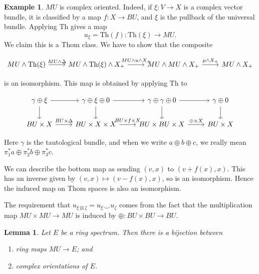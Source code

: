 \documentclass{shortart}
\newtheorem{lemma}[thm]{Lemma}
\theoremstyle{definition}
\newtheorem{eg}[thm]{Example}
\newcommand\Th{\mathrm{Th}}
\begin{document}
\begin{eg}
  $MU$ is complex oriented. Indeed, if $\xi: V \to X$ is a complex vector bundle, it is classified by a map $f: X \to BU$, and $\xi$ is the pullback of the universal bundle. Applying $\Th$ gives a map
  \[
    u_\xi = \Th(f): \Th(\xi) \to MU.
  \]
  We claim this is a Thom class. We have to show that the composite
  \begin{useimager}
    \[
      \begin{tikzcd}
        MU \wedge \Th(\xi) \ar[r, "MU \wedge \Delta"] & MU \wedge \Th(\xi) \wedge X_+ \ar[r, "MU \wedge u \wedge X_+"] & MU \wedge MU \wedge X_+ \ar[r, "\mu \wedge X_+"] & MU \wedge X_+
      \end{tikzcd}
    \]
  \end{useimager}
  is an isomorphism. This map is obtained by applying $\Th$ to
  \begin{useimager}
    \[
      \begin{tikzcd}
        \gamma \oplus \xi \ar[d] \ar[r] & \gamma \oplus \xi \oplus 0 \ar[d] \ar[r] & \gamma \oplus \gamma \oplus 0 \ar[d] \ar[r] & \gamma \oplus 0 \ar[d]\\
        BU \times X \ar[r, "BU \times \Delta"] & BU \times X \times X \ar[r, "BU \times f \times X"] & BU \times BU \times X \ar[r, "\oplus \times X"] & BU \times X
      \end{tikzcd}
    \]
  \end{useimager}
  Here $\gamma$ is the tautological bundle, and when we write $a \oplus b \oplus c$, we really mean $\pi_1^* a \oplus \pi_2^* b \oplus \pi_3^* c$.

  We can describe the bottom map as sending $(v, x)$ to $(v + f(x), x)$. This has an inverse given by $(v, x) \mapsto (v - f(x), x)$, so is an isomorphism. Hence the induced map on Thom spaces is also an isomorphism.

  The requirement that $u_{\xi \boxplus \zeta} = u_\xi \smile u_\zeta$ comes from the fact that the multiplication map $MU \times MU \to MU$ is induced by $\oplus: BU \times BU \to BU$.
\end{eg}

\begin{lemma}
  Let $E$ be a ring spectrum. Then there is a bijection between
  \begin{enumerate}
    \item ring maps $MU \to E$; and
    \item complex orientations of $E$.
  \end{enumerate}
\end{lemma}
\end{document}
